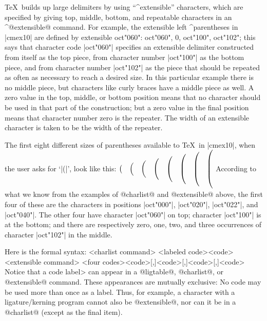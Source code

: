 \TeX\ builds up large delimiters by using ``^{extensible}'' characters,
which are specified by giving top, middle, bottom, and repeatable
characters in an ^@extensible@ command. For example, the extensible
left ^{parentheses} in |cmex10| are defined by
\begintt
extensible oct"060": oct"060", 0, oct"100", oct"102";
\endtt
this says that character code |oct"060"| specifies an extensible
delimiter constructed from itself as the top piece, from character number
|oct"100"| as the bottom piece, and from character number |oct"102"| as
the piece that should be repeated as often as necessary to reach
a desired size. In this particular example there is no middle
piece, but characters like curly braces have a middle piece as well.
A zero value in the top, middle, or bottom position means that
no character should be used in that part of the construction;
but a zero value in the final position means that character number zero
is the repeater. The width of an extensible character is taken to
be the width of the repeater. 

The first eight different sizes of parentheses available to \TeX\ in
|cmex10|, when the user asks for `|\left(|', look like this:
\begindisplay
$\bigl(\quad\Bigl(\quad\biggl(\quad\Biggl(\quad
\mathopen{\hbox{$\left(\vbox to20.5pt{}\right.\nulldelimiterspace=0pt$}}\quad
\mathopen{\hbox{$\left(\vbox to23.5pt{}\right.\nulldelimiterspace=0pt$}}\quad
\mathopen{\hbox{$\left(\vbox to26.5pt{}\right.\nulldelimiterspace=0pt$}}\quad
\mathopen{\hbox{$\left(\vbox to29.5pt{}\right.\nulldelimiterspace=0pt$}}$
\enddisplay
According to what we know from the examples of @charlist@ and @extensible@
above, the first four of these are the characters in positions
|oct"000"|, |oct"020"|, |oct"022"|, and |oct"040"|. The other four have
character |oct"060"| on top; character |oct"100"| is at the bottom;
and there are respectively zero, one, two, and three occurrences
of character |oct"102"| in the middle.

Here is the formal syntax:
\beginsyntax
<charlist command>
<labeled code>\is<code>
<extensible command>
<four codes>\is<code>[,]<code>[,]<code>[,]<code>
\endsyntax
Notice that a \<code label> can appear in a @ligtable@, @charlist@, or
@extensible@ command. These appearances are mutually exclusive: No code may be
used more than once as a label. Thus, for example, a character with a
ligature/kerning program cannot also be @extensible@, nor can it be
in a @charlist@ (except as the final item).

